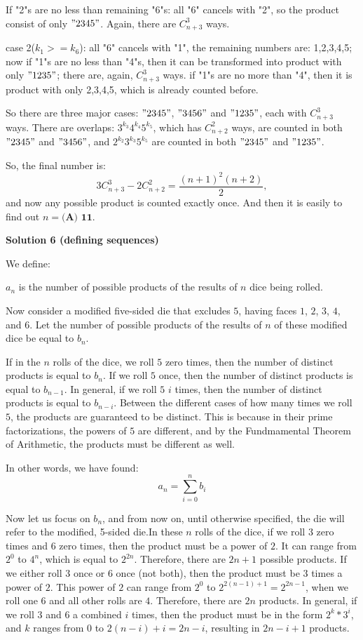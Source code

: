 \begin{enumerate}
 If "2"s are no less than remaining "6"s: all "6" cancels with "2", so the product consist of only $"2345"$. Again, there are $C^3_{n+3}$ ways.

 case 2($k_1>=k_6$): all "6" cancels with "1", the remaining numbers are: 1,2,3,4,5; now if "1"s are no less than "4"s, then it can be transformed into product with only $"1235"$; there are, again, $C^3_{n+3}$ ways. if "1"s are no more than "4", then it is product with only 2,3,4,5, which is already counted before.

 So there are three major cases:  $"2345"$, $"3456"$ and $"1235"$, each with $C^3_{n+3}$ ways. There are overlaps: $3^{k_3} 4^{k_4} 5^{k_5}$, which has $C^2_{n+2}$ ways, are counted in both $"2345"$ and $"3456"$, and $2^{k_2} 3^{k_3} 5^{k_5}$  are counted in both $"2345"$ and $"1235"$.

 So, the final number is: 
 \[3C^3_{n+3}-2C^2_{n+2}=\frac{(n+1)^2 (n+2)}{2},\]and now any possible product is counted exactly once. And then it is easily to find out $n = \boxed{\textbf{(A) 11}}$.

 



\textbf{Solution 6 (defining sequences)}

We define:

 $a_n$ is the number of possible products of the results of $n$ dice being rolled.

 
Now consider a modified five-sided die that excludes $5$, having faces $1$, $2$, $3$, $4$, and $6$. Let the number of possible products of the results of $n$ of these modified dice be equal to $b_n$.

 If in the $n$ rolls of the dice, we roll $5$ zero times, then the number of distinct products is equal to $b_n$. If we roll $5$ once, then the number of distinct products is equal to $b_{n-1}$. In general, if we roll $5$ $i$ times, then the number of distinct products is equal to $b_{n-i}$. Between the different cases of how many times we roll $5$, the products are guaranteed to be distinct. This is because in their prime factorizations, the powers of $5$ are different, and by the Fundmamental Theorem of Arithmetic, the products must be different as well.

 In other words, we have found:
 \[a_n=\sum_{i=0}^{n} b_i\]

 Now let us focus on $b_n$, and from now on, until otherwise specified, the die will refer to the modified, 5-sided die.In these $n$ rolls of the dice, if we roll $3$ zero times and $6$ zero times, then the product must be a power of $2$. It can range from $2^0$ to $4^n$, which is equal to $2^{2n}$. Therefore, there are $2n+1$ possible products. If we either roll $3$ once or $6$ once (not both), then the product must be $3$ times a power of $2$. This power of $2$ can range from $2^0$ to $2^{2(n-1)+1}=2^{2n-1}$, when we roll one $6$ and all other rolls are $4$. Therefore, there are $2n$ products. In general, if we roll $3$ and $6$ a combined $i$ times, then the product must be in the form $2^k * 3^i$, and $k$ ranges from $0$ to $2(n-i)+i=2n-i$, resulting in $2n-i+1$ products.


\end{enumerate}
